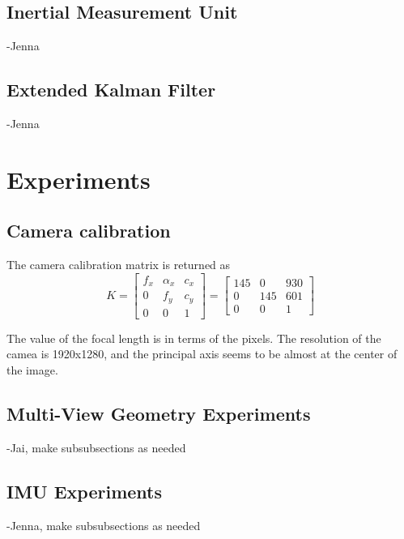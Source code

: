 \documentclass[12pt,twocolumn,letterpaper]{article}
\begin{document}
\subsection{Inertial Measurement Unit}
    -Jenna
\subsection{Extended Kalman Filter}
    -Jenna
\section{Experiments}

\subsection{Camera calibration}
The camera calibration matrix is returned as
\begin{equation}
K = \begin{bmatrix}
f_x & \alpha_x & c_x\\
0 & f_y &  c_y\\
0 & 0 & 1
\end{bmatrix} = \begin{bmatrix}
145 & 0 & 930\\
 0 &145 & 601\\
0 & 0 & 1
\end{bmatrix}
\end{equation}

The value of the focal length is in terms of the pixels. The resolution of the camea is 1920x1280, and the principal axis seems to be almost at the center of the image.

\subsection{Multi-View Geometry Experiments}
    -Jai, make subsubsections as needed
\subsection{IMU Experiments}
    -Jenna, make subsubsections as needed
\end{document}
